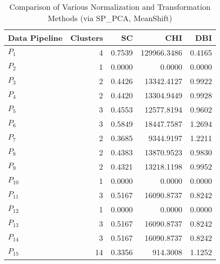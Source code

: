 \begin{table}[t]
\centering
\caption{Comparison of Various Normalization and Transformation Methods (via SP_PCA, MeanShift)}
\label{tbl:Comparison_SP_PCA_MeanShift_norm_tran}
\begin{tabular}{lrrrr}
\toprule
Data Pipeline &  Clusters &     SC &         CHI &    DBI \\
\midrule
      $P_{1}$ &         4 & 0.7539 & 129966.3486 & 0.4165 \\
      $P_{2}$ &         1 & 0.0000 &      0.0000 & 0.0000 \\
      $P_{3}$ &         2 & 0.4426 &  13342.4127 & 0.9922 \\
      $P_{4}$ &         2 & 0.4420 &  13304.9449 & 0.9928 \\
      $P_{5}$ &         3 & 0.4553 &  12577.8194 & 0.9602 \\
      $P_{6}$ &         3 & 0.5849 &  18447.7587 & 1.2694 \\
      $P_{7}$ &         2 & 0.3685 &   9344.9197 & 1.2211 \\
      $P_{8}$ &         2 & 0.4383 &  13870.9523 & 0.9830 \\
      $P_{9}$ &         2 & 0.4321 &  13218.1198 & 0.9952 \\
     $P_{10}$ &         1 & 0.0000 &      0.0000 & 0.0000 \\
     $P_{11}$ &         3 & 0.5167 &  16090.8737 & 0.8242 \\
     $P_{12}$ &         1 & 0.0000 &      0.0000 & 0.0000 \\
     $P_{13}$ &         3 & 0.5167 &  16090.8737 & 0.8242 \\
     $P_{14}$ &         3 & 0.5167 &  16090.8737 & 0.8242 \\
     $P_{15}$ &        14 & 0.3356 &    914.3008 & 1.1252 \\
\bottomrule
\end{tabular}
\end{table}

